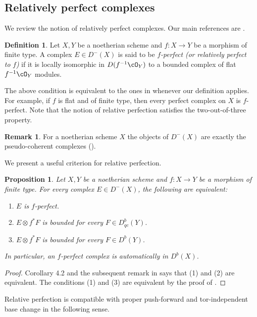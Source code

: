 \documentclass{amsart}
\numberwithin{equation}{section}
\theoremstyle{plain}
\newtheorem{proposition}[theorem]{Proposition}
\theoremstyle{definition}
\newtheorem{definition}[theorem]{Definition}
\newtheorem{remark}[theorem]{Remark}
\begin{document}
\subsection{Relatively perfect complexes}
We review the notion of relatively perfect complexes.
Our main references are \cite{10.1007/BFb0066287, MR3720794, MR4604981, stacks-project}.
\begin{definition}
    Let $X, Y$ be a noetherian scheme and $f \colon X \to Y$ be a morphism of finite type.
    A complex $E \in D^-(X)$ is said to be \emph{$f$-perfect (or relatively perfect to $f$)} if it is locally isomorphic in $D(f^{-1}\cO_Y)$ to a bounded complex of flat $f^{-1}\cO_Y$ modules.
\end{definition}
The above condition is equivalent to the ones in \cite{10.1007/BFb0066287, MR3720794, MR4604981} whenever our definition applies.
For example, if $f$ is flat and of finite type, then every perfect complex on $X$ is $f$-perfect.
Note that the notion of relative perfection satisfies the two-out-of-three property.
\begin{remark}
    For a noetherian scheme $X$ the objects of $D^{-}(X)$ are exactly the pseudo-coherent complexes (\cite[\href{https://stacks.math.columbia.edu/tag/08E8}{Tag 08E8}]{stacks-project}).
\end{remark}
We present a useful criterion for relative perfection.
\begin{proposition}\label{prop:crirtion_for_relative_perfection}
    Let $X, Y$ be a noetherian scheme and $f \colon X \to Y$ be a morphism of finite type.
    For every complex $E \in D^{-}(X)$, the following are equivalent:
    \begin{enumerate}
        \item $E$ is $f$-perfect.
        \item $E \otimes f^*F$ is bounded for every $F \in D_{qc}^b(Y)$.
        \item $E \otimes f^*F$ is bounded for every $F \in D^b(Y)$.
    \end{enumerate}
    In particular, an $f$-perfect complex is automatically in $D^b(X)$.
\end{proposition}
\begin{proof}
    Corollary 4.2 and the subsequent remark in \cite{MR4604981} says that (1) and (2) are equivalent.
    The conditions (1) and (3) are equivalent by the proof of \cite[Lemma 5.1]{MR3720794}.
\end{proof}
Relative perfection is compatible with proper push-forward and tor-independent base change in the following sense.
\end{document}
